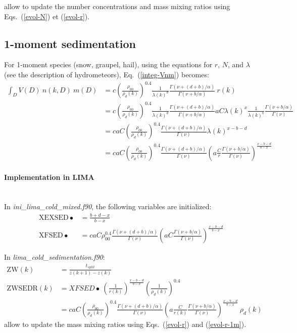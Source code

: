 {allow to update the number concentrations and mass mixing ratios using Eqs.\ (\ref{evol-N}) et (\ref{evol-r}).

\subsection{1-moment sedimentation}

For 1-moment species (snow, graupel, hail), using the equations for $r$, $N$, and $\lambda$ (see the description of hydrometeors), Eq.\ (\ref{integ-Vnm}) becomes:
\begin{align}
 \int_D V(D)~n(k,D)~m(D) &= c \left(\frac{\rho_{00}}{\rho_d(k)}\right)^{0.4} \frac{1}{\lambda(k)^d} \frac{\Gamma(\nu+(d+b)/\alpha)}{\Gamma(\nu+b/\alpha)} ~ r(k) \\
 &= c \left(\frac{\rho_{00}}{\rho_d(k)}\right)^{0.4} \frac{1}{\lambda(k)^d} \frac{\Gamma(\nu+(d+b)/\alpha)}{\Gamma(\nu+b/\alpha)} a C \lambda(k)^{x}\frac{1}{\lambda(k)^b} \frac{\Gamma(\nu + b/\alpha)}{\Gamma(\nu)} \\
 &= caC \left(\frac{\rho_{00}}{\rho_d(k)}\right)^{0.4} \frac{\Gamma(\nu+(d+b)/\alpha)}{\Gamma(\nu)} \lambda(k)^{x-b-d} \\
 \label{evol-r-1m}
 &= caC \left(\frac{\rho_{00}}{\rho_d(k)}\right)^{0.4} \frac{\Gamma(\nu+(d+b)/\alpha)}{\Gamma(\nu)} \left( a \frac{C}{r} \frac{\Gamma(\nu+b/\alpha)}{\Gamma(\nu)}\right)^{\frac{x-b-d}{b-x}}
\end{align}

\paragraph{Implementation in LIMA}
~\\
In \emph{ini\_lima\_cold\_mixed.f90}, the following variables are initialized:
\begin{align}
 \mathrm{XEXSED\bullet} &= \frac{b+d-x}{b-x} \\
 \mathrm{XFSED\bullet} &= caC \rho_{00}^{0.4} \frac{\Gamma(\nu+(d+b)/\alpha)}{\Gamma(\nu)} \left( aC \frac{\Gamma(\nu+b/\alpha)}{\Gamma(\nu)} \right)^{\frac{x-b-d}{b-x}}
\end{align}

In \emph{lima\_cold\_sedimentation.f90}:
\begin{align}
 \mathrm{ZW}(k) &= \frac{t_{split}}{z(k+1)-z(k)} \\
 \mathrm{ZWSEDR}(k) &= XFSED\bullet ~ \left(\frac{1}{r(k)}\right)^{\frac{x-b-d}{b-x}} \left(\frac{1}{\rho_d(k)}\right)^{0.4} \\
 &= caC \left(\frac{\rho_{00}}{\rho_d(k)}\right)^{0.4} \frac{\Gamma(\nu+(d+b)/\alpha)}{\Gamma(\nu)} \left( a \frac{C}{r(k)} \frac{\Gamma(\nu+b/\alpha)}{\Gamma(\nu)}\right)^{\frac{x-b-d}{b-x}} ~ \rho_d(k)
\end{align}
allow to update the mass mixing ratios using Eqs.\ (\ref{evol-r}) and (\ref{evol-r-1m}).




}
